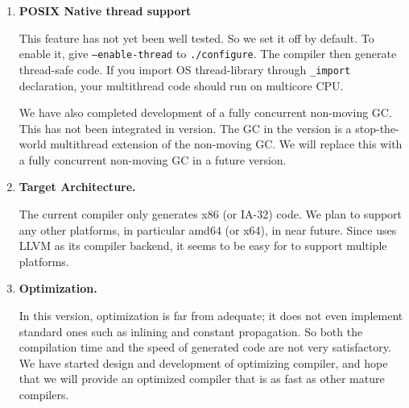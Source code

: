 \begin{enumerate}
\item {\bf POSIX Native thread support}

	This feature has not yet been well tested.
	So we set it off by default.
	To enable it, give {\tt --enable-thread} to {\tt ./configure}. 
	The compiler then generate thread-safe code.
	If you import OS thread-library through {\tt \_import}
declaration, your multithread code should run on multicore CPU.

	We have also completed development of a fully concurrent
non-moving GC.
	This has not been integrated in \version{} version.
	The GC in the \version{} version is a stop-the-world multithread
extension of the non-moving GC.
	We will replace this with a fully concurrent non-moving GC in
a future version.

\item {\bf Target Architecture.}

	The current compiler only generates x86 (or IA-32) code.
	We plan to support any other platforms, in particular amd64 (or x64),
in near future.
	Since \smlsharp{}\version{} uses LLVM as its compiler backend,
it seems to be easy for \smlsharp{} to support multiple platforms.

\item {\bf Optimization.}

	In this version, optimization is far from adequate; it does not
even implement standard ones such as inlining and constant propagation.
	So both the compilation time and the speed of generated code are
not very satisfactory.
	We have started design and development of optimizing \smlsharp{}
compiler, and hope that we will provide an optimized \smlsharp{}
compiler that is as fast as other mature compilers.

%

%

%

\end{enumerate}
